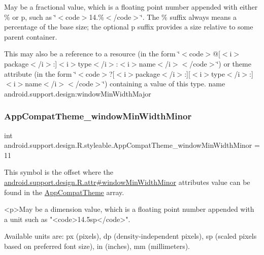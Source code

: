 May be a fractional value, which is a floating point number appended with either \% or p, such as \char`\"{}$<$code$>$14.\%$<$/code$>$\char`\"{}. The \% suffix always means a percentage of the base size; the optional p suffix provides a size relative to some parent container. 

This may also be a reference to a resource (in the form \char`\"{}$<$code$>$@\mbox{[}$<$i$>$package$<$/i$>$\+:\mbox{]}$<$i$>$type$<$/i$>$\+:$<$i$>$name$<$/i$>$$<$/code$>$\char`\"{}) or theme attribute (in the form \char`\"{}$<$code$>$?\mbox{[}$<$i$>$package$<$/i$>$\+:\mbox{]}\mbox{[}$<$i$>$type$<$/i$>$\+:\mbox{]}$<$i$>$name$<$/i$>$$<$/code$>$\char`\"{}) containing a value of this type.  name android.\+support.\+design\+:window\+Min\+Width\+Major \mbox{\label{classandroid_1_1support_1_1design_1_1R_1_1styleable_a021b9cf9e84f6d782b685e0d9a05866a}} 
\subsubsection{\texorpdfstring{App\+Compat\+Theme\+\_\+window\+Min\+Width\+Minor}{AppCompatTheme\_windowMinWidthMinor}}
{\footnotesize\ttfamily int android.\+support.\+design.\+R.\+styleable.\+App\+Compat\+Theme\+\_\+window\+Min\+Width\+Minor = 11\hspace{0.3cm}{\ttfamily [static]}}

This symbol is the offset where the \hyperlink{classandroid_1_1support_1_1design_1_1R_1_1attr_a0d5fe2b5cabad2d90ed3efb075a1ac99}{android.\+support.\+design.\+R.\+attr\#window\+Min\+Width\+Minor} attribute\textquotesingle{}s value can be found in the \hyperlink{classandroid_1_1support_1_1design_1_1R_1_1styleable_afb351dc8de20cbd4c89abe360373010c}{App\+Compat\+Theme} array.

\begin{DoxyVerb}      <p>May be a dimension value, which is a floating point number appended with a unit such as "<code>14.5sp</code>".
\end{DoxyVerb}
 Available units are\+: px (pixels), dp (density-\/independent pixels), sp (scaled pixels based on preferred font size), in (inches), mm (millimeters). 

